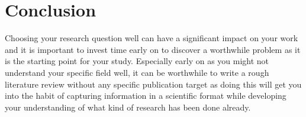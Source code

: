 \section{Conclusion}

Choosing your research question well can have a significant impact on your work and it is important to invest time early on to discover a worthwhile problem as it is the starting point for your study.
Especially early on as you might not understand your specific field well, it can be worthwhile to write a rough literature review without any specific publication target as doing this will get you into the habit of capturing information in a scientific format while developing your understanding of what kind of research has been done already.

